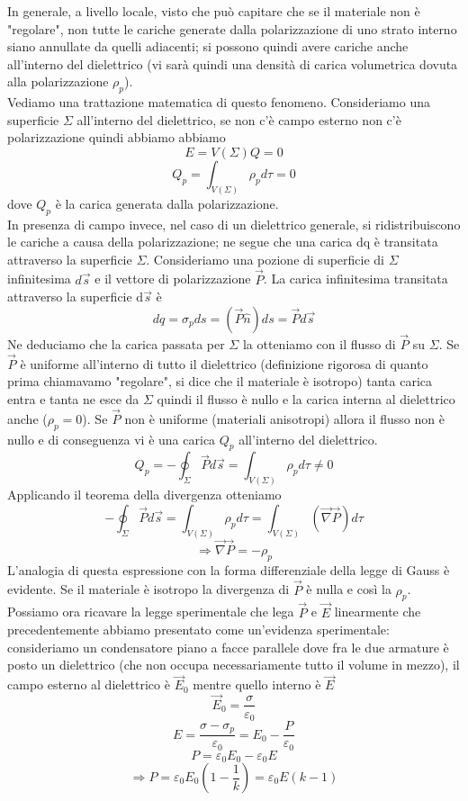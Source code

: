 \documentclass[10pt,a4paper]{article}
\begin{document}
In generale, a livello locale, visto che può capitare che se il materiale non è "regolare", non tutte le cariche generate dalla polarizzazione di uno strato interno siano annullate da quelli adiacenti; si possono quindi avere cariche anche all'interno del dielettrico (vi sarà quindi una densità di carica volumetrica dovuta alla polarizzazione \(\rho_p\)).\\
Vediamo una trattazione matematica di questo fenomeno. Consideriamo una superficie $\Sigma$ all'interno del dielettrico, se non c'è campo esterno non c'è polarizzazione quindi abbiamo abbiamo
\[E = V(\Sigma) Q = 0\]
\[Q_p = \int_{V(\Sigma)}\rho_p d\tau = 0\]
dove \(Q_p\) è la carica generata dalla polarizzazione.\\
In presenza di campo invece, nel caso di un dielettrico generale, si ridistribuiscono le cariche a causa della polarizzazione; ne segue che una carica dq è transitata attraverso la superficie $\Sigma$. Consideriamo una pozione di superficie di \(\Sigma\) infinitesima $d\vec{s}$ e il vettore di polarizzazione $\vec{P}$. La carica infinitesima transitata attraverso la superficie d$\vec{s}$ è
\[dq = \sigma_pds=(\vec{P}\hat{n})ds = \vec{P}d\vec{s}\]
Ne deduciamo che la carica passata per \(\Sigma\) la otteniamo con il flusso di $\vec{P}$ su $\Sigma$. Se $\vec{P}$ è uniforme all'interno di tutto il dielettrico (definizione rigorosa di quanto prima chiamavamo "regolare", si dice che il materiale è isotropo) tanta carica entra e tanta ne esce da $\Sigma$ quindi il flusso è nullo e la carica interna al dielettrico anche (\(\rho_p = 0\)). Se $\vec{P}$ non è uniforme (materiali anisotropi) allora il flusso non è nullo e di conseguenza vi è una carica $Q_p$ all'interno del dielettrico. 
\[ Q_p = -\oint_{\Sigma} \vec{P}d\vec{s} = \int_{V(\Sigma)}\rho_p d\tau \neq 0 \]
Applicando il teorema della divergenza otteniamo
\[-\oint_{\Sigma} \vec{P}d\vec{s} = \int_{V(\Sigma)}\rho_p d\tau = \int_{V(\Sigma)}(\vec{\nabla}\vec{P})d\tau \]
\[\Rightarrow \vec{\nabla}\vec{P} = -\rho_p\]
L'analogia di questa espressione con la forma differenziale della legge di Gauss è evidente. Se il materiale è isotropo la divergenza di $\vec{P}$ è nulla e così la \(\rho_p\).\\
Possiamo ora ricavare la legge sperimentale che lega $\vec{P}$ e $\vec{E}$ linearmente che precedentemente abbiamo presentato come un'evidenza sperimentale: consideriamo un condensatore piano a facce parallele dove fra le due armature è posto un dielettrico (che non occupa necessariamente tutto il volume in mezzo), il campo esterno al dielettrico è $\vec{E}_0$ mentre quello interno è $\vec{E}$
\[\vec{E}_0 = \frac{\sigma}{\varepsilon_0}\]
\[E = \frac{\sigma - \sigma_p}{\varepsilon_0} = E_0 -\frac{P}{\varepsilon_0}\]
\[P = \varepsilon_0 E_0- \varepsilon_0 E\]
\[\Rightarrow P = \varepsilon_0 E_0 (1-\frac{1}{k}) = \varepsilon_0 E(k-1) \]
\end{document}
